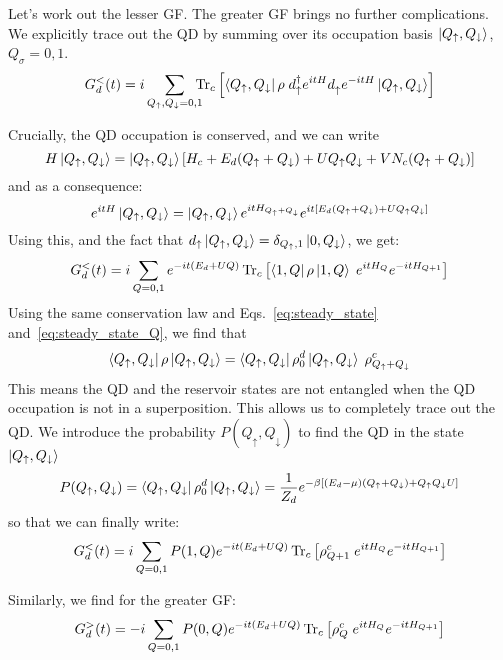 \documentclass[12pt]{article}
\newcommand\up{\uparrow}
\newcommand\dn{\downarrow}
\newcommand\nodag{{\vphantom{\dagger}}}
\begin{document}
Let's work out the lesser \ac{GF}. The greater \ac{GF} brings no further complications.
We explicitly trace out the \ac{QD} by summing over its occupation basis $\ket{Q_\up, Q_\dn}$, $Q_\sigma=0, 1$.
\begin{equation}
	G^<_d(t) = i \sum_{Q_\up, Q_\dn=0,1} \!\!\!\! \Tr_c \qty[ \bra{Q_\up, Q_\dn} \rho\; d_\up^\dagger e^{itH} d_\up^\nodag e^{-itH} \ket{Q_\up, Q_\dn}]
\end{equation}

Crucially, the \ac{QD} occupation is conserved, and we can write
\begin{equation}
	H \ket{Q_\up, Q_\dn} = \ket{Q_\up, Q_\dn} \qty[H_c + E_d (Q_\up + Q_\dn) + U Q_\up Q_\dn + VN_c(Q_\up + Q_\dn)]
\end{equation}
and as a consequence:
\begin{equation}
	e^{itH} \ket{Q_\up, Q_\dn} = \ket{Q_\up, Q_\dn} e^{itH_{Q_\up + Q_\dn}} e^{it\qty[E_d(Q_\up + Q_\dn) + U Q_\up Q_\dn]}
\end{equation}
Using this, and the fact that $d_\up \ket{Q_\up,Q_\dn} = \delta_{Q_\up,1} \ket{0, Q_\dn}$, we get:
\begin{equation}
	G^<_d(t) = i \sum_{Q=0,1} e^{-it(E_d + UQ)} \Tr_c \qty[\bra{1,Q}\rho\ket{1,Q} \; e^{it H_Q} e^{-it H_{Q+1}}]
\end{equation}
Using the same conservation law and Eqs.~\eqref{eq:steady_state} and~\eqref{eq:steady_state_Q}, we find that
\begin{equation}
	\bra{Q_\up, Q_\dn} \rho \ket{Q_\up, Q_\dn} = \bra{Q_\up, Q_\dn} \rho_0^d \ket{Q_\up, Q_\dn} \; \rho_{Q_\up + Q_\dn}^c
\end{equation}
This means the \ac{QD} and the reservoir states are not entangled when the \ac{QD} occupation is not in a superposition. This allows us to completely trace out the \ac{QD}.
We introduce the probability $P(Q_\up, Q_\dn)$ to find the \ac{QD} in the state  $\ket{Q_\up, Q_\dn}$
\begin{equation}
	P(Q_\up, Q_\dn) = \bra{Q_\up, Q_\dn} \rho_0^d \ket{Q_\up, Q_\dn} = \frac{1}{Z_d} e^{-\beta\qty[(E_d - \mu) (Q_\up + Q_\dn) + Q_\up Q_\dn U]}
\end{equation}
so that we can finally write:
\begin{equation}
	G^<_d(t) = i \sum_{Q=0,1} P(1, Q) e^{-it(E_d + UQ)} \Tr_c \qty[\rho^c_{Q+1} \; e^{it H_Q} e^{-it H_{Q+1}}]
\end{equation}

Similarly, we find for the greater \ac{GF}:
\begin{equation}
	G^>_d(t) = -i \sum_{Q=0,1} P(0, Q) e^{-it(E_d + UQ)} \Tr_c \qty[\rho^c_{Q} \; e^{it H_Q} e^{-it H_{Q+1}}]
\end{equation}
\end{document}

